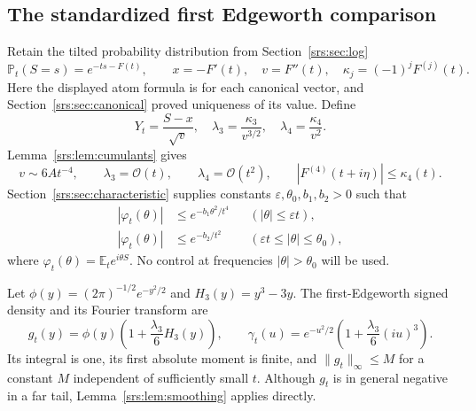 \documentclass[11pt]{article}
\numberwithin{equation}{section}
\theoremstyle{remark}\newtheorem{remark}[theorem]{Remark}
\newcommand{\Oh}{\mathcal O}
\newcommand{\E}{\mathbb E}
\newcommand{\Pp}{\mathbb P}
\begin{document}
\subsection{The standardized first Edgeworth comparison}
Retain the tilted probability distribution from Section~\ref{srs:sec:log}
\[
 \Pp_t(S=s)=e^{-ts-F(t)},\qquad
 x=-F'(t),\quad v=F''(t),\quad \kappa_j=(-1)^jF^{(j)}(t).
\]
Here the displayed atom formula is for each canonical vector, and Section~\ref{srs:sec:canonical} proved uniqueness of its value. Define
\[
 Y_t=\frac{S-x}{\sqrt v},\quad
 \lambda_3=\frac{\kappa_3}{v^{3/2}},\quad
 \lambda_4=\frac{\kappa_4}{v^2}.
\]
Lemma~\ref{srs:lem:cumulants} gives
\begin{equation}\label{srs:eq:moments}
 v\sim6At^{-4},\qquad \lambda_3=\Oh(t),\qquad
 \lambda_4=\Oh(t^2),\qquad
 |F^{(4)}(t+i\eta)|\le\kappa_4(t).
\end{equation}
Section~\ref{srs:sec:characteristic} supplies constants $\varepsilon,\theta_0,b_1,b_2>0$ such that
\begin{align}
 |\varphi_t(\theta)|&\le e^{-b_1\theta^2/t^4}
 &&(|\theta|\le\varepsilon t),\label{srs:eq:small}\\
 |\varphi_t(\theta)|&\le e^{-b_2/t^2}
 &&(\varepsilon t\le|\theta|\le\theta_0),\label{srs:eq:moderate}
\end{align}
where $\varphi_t(\theta)=\E_t e^{i\theta S}$. No control at frequencies $|\theta|>\theta_0$ will be used.

Let $\phi(y)=(2\pi)^{-1/2}e^{-y^2/2}$ and $H_3(y)=y^3-3y$. The first-Edgeworth signed density and its Fourier transform are
\begin{equation}\label{srs:eq:edge}
 g_t(y)=\phi(y)\left(1+\frac{\lambda_3}{6}H_3(y)\right),\qquad
 \gamma_t(u)=e^{-u^2/2}\left(1+\frac{\lambda_3}{6}(iu)^3\right).
\end{equation}
Its integral is one, its first absolute moment is finite, and
$\|g_t\|_\infty\le M$ for a constant $M$ independent of sufficiently small $t$. Although $g_t$ is in general negative in a far tail, Lemma~\ref{srs:lem:smoothing} applies directly.
\end{document}
